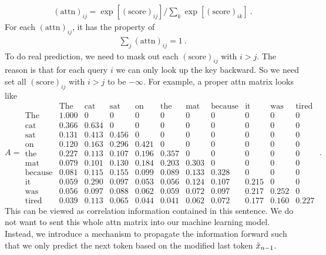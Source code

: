 \documentclass{article}
\begin{document}
\begin{align}
    (\textrm{attn})_{ij} = \exp[ (\textrm{score})_{ij}]/\sum_{k}\exp[ (\textrm{score})_{ik}]~.
\end{align}
For each $(\textrm{attn})_{ij}$, it has the property of
\begin{align}
    \sum_{j}(\textrm{attn})_{ij} = 1~.
\end{align}
To do real prediction, we need to mask out each $(\textrm{score})_{ij}$ with $i > j$. The reason is that for each query \(i\) we can only look up the key backward. So we need set all $(\textrm{score})_{ij}$ with $i > j$ to be $-\infty$. For example, a proper attn matrix looks like 
\[
A=
\begin{array}{c|cccccccccc}
 & \text{The} & \text{cat} & \text{sat} & \text{on} & \text{the}
 & \text{mat} & \text{because} & \text{it} & \text{was} & \text{tired}\\
\hline

\text{The}
&1.000&0&0&0&0&0&0&0&0&0\\

\text{cat}
&0.366&0.634&0&0&0&0&0&0&0&0\\

\text{sat}
&0.131&0.413&0.456&0&0&0&0&0&0&0\\

\text{on}
&0.120&0.163&0.296&0.421&0&0&0&0&0&0\\

\text{the}
&0.227&0.113&0.107&0.196&0.357&0&0&0&0&0\\

\text{mat}
&0.079&0.101&0.130&0.184&0.203&0.303&0&0&0&0\\

\text{because}
&0.081&0.115&0.155&0.099&0.089&0.133&0.328&0&0&0\\

\text{it}
&0.059&0.290&0.097&0.053&0.056&0.124&0.107&0.215&0&0\\

\text{was}
&0.056&0.097&0.088&0.062&0.059&0.072&0.097&0.217&0.252&0\\

\text{tired}
&0.039&0.113&0.065&0.044&0.041&0.062&0.072&0.177&0.160&0.227
\end{array}~.
\]
This can be viewed as correlation information contained in this sentence. We do not want to sent this whole attn matrix into our machine learning model. Instead, we introduce a mechanism to propagate the information forward such that we only predict the next token based on the modified last token \(\Tilde{x}_{n-1}\).
\end{document}
